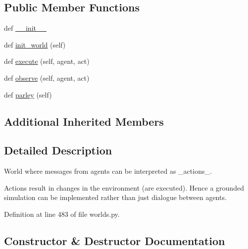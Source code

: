 \subsection*{Public Member Functions}
\begin{DoxyCompactItemize}
\item 
def \hyperlink{classparlai_1_1core_1_1worlds_1_1ExecutableWorld_aae21e5b85507d11efd412d298f94bf2f}{\+\_\+\+\_\+init\+\_\+\+\_\+}
\item 
def \hyperlink{classparlai_1_1core_1_1worlds_1_1ExecutableWorld_a8bb31ec1d93a94cb261f89ce0992159a}{init\+\_\+world} (self)
\item 
def \hyperlink{classparlai_1_1core_1_1worlds_1_1ExecutableWorld_a318fbf7c75178f62a6d46647f1a063fa}{execute} (self, agent, act)
\item 
def \hyperlink{classparlai_1_1core_1_1worlds_1_1ExecutableWorld_a69934ec2181a8b22269e02ab8b3bb1f2}{observe} (self, agent, act)
\item 
def \hyperlink{classparlai_1_1core_1_1worlds_1_1ExecutableWorld_a6555592d2b7c316e72febc1fccf43bdb}{parley} (self)
\end{DoxyCompactItemize}
\subsection*{Additional Inherited Members}


\subsection{Detailed Description}
\begin{DoxyVerb}World where messages from agents can be interpreted as _actions_.

Actions result in changes in the environment (are executed). Hence a grounded
simulation can be implemented rather than just dialogue between agents.
\end{DoxyVerb}
 

Definition at line 483 of file worlds.\+py.



\subsection{Constructor \& Destructor Documentation}
\mbox{\label{classparlai_1_1core_1_1worlds_1_1ExecutableWorld_aae21e5b85507d11efd412d298f94bf2f}} 
